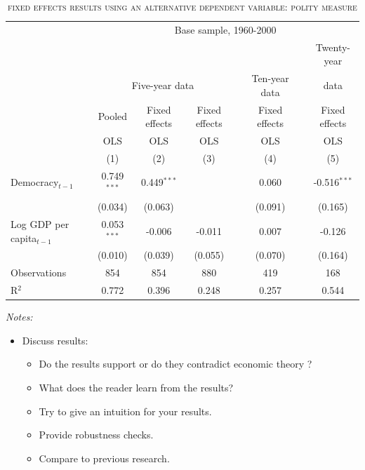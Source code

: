 \begin{table}[h] \centering
	\begin{adjustbox}{max width=\textwidth}
		\begin{threeparttable}
			\caption{\textsc{fixed effects results using an alternative dependent variable: polity measure}}			
			\begin{tabular}{l*{7}{c}} 
				\hline\hline
				& \multicolumn{7}{c}{Base sample, 1960-2000}\\
				\cline{2-8}
				& & &&& & &Twenty-year\\[-1.8ex]
				& \multicolumn{3}{c}{Five-year data} && \multicolumn{1}{c}{Ten-year data} && \multicolumn{1}{c}{data}\\
				\cline{2-4}\cline{6-6}\cline{8-8}	
				&Pooled &Fixed effects &Fixed effects &&Fixed effects &&Fixed effects \\[-1.8ex] 	
				&OLS &OLS &OLS &&OLS &&OLS \\[-1.8ex] 			 
				&\multicolumn{1}{c}{(1)} &\multicolumn{1}{c}{(2)} &\multicolumn{1}{c}{(3)} &&\multicolumn{1}{c}{(4)} &&\multicolumn{1}{c}{(5)}\\ 
				\hline 
				Democracy${}_{t-1}$ & 0.749$^{***}$ & 0.449$^{***}$ &  && 0.060 && -0.516$^{***}$ \\[-1.8ex]
				& (0.034) & (0.063) &  && (0.091) && (0.165) \\ 
				Log GDP per capita${}_{t-1}$ & 0.053$^{***}$ & -0.006 & -0.011 && 0.007 && -0.126 \\[-1.8ex] 
				& (0.010) & (0.039) & (0.055) && (0.070) && (0.164) \\ 
				Observations & \multicolumn{1}{c}{854} & \multicolumn{1}{c}{854} & \multicolumn{1}{c}{880} && \multicolumn{1}{c}{419} && \multicolumn{1}{c}{168} \\ 
				R$^{2}$ & \multicolumn{1}{c}{0.772} & \multicolumn{1}{c}{0.396} & \multicolumn{1}{c}{0.248} && \multicolumn{1}{c}{0.257} && \multicolumn{1}{c}{0.544} \\
				\hline 
			\end{tabular}
			\begin{tablenotes}
				\item \textit{Notes:} 
			\end{tablenotes}
		\end{threeparttable}	
	\end{adjustbox}
\end{table}
\begin{itemize}
    \item Discuss results:
        \begin{itemize}
            \item Do the results support or do they contradict economic theory ?
            \item What does the reader learn from the results?
            \item Try to give an intuition for your results.
            \item Provide robustness checks.
            \item Compare to previous research.
        \end{itemize}
\end{itemize}
